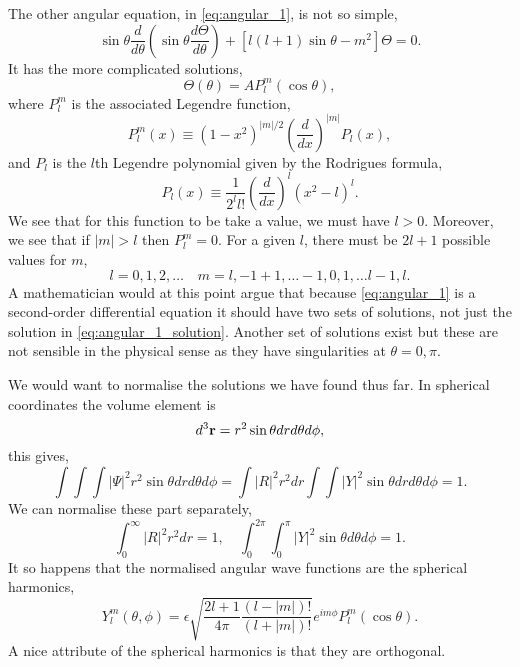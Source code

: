 The other angular equation, in \autoref{eq:angular_1}, is not so simple,
\begin{equation}
    \sin\theta\frac{d}{d\theta}\left(\sin\theta\frac{d\Theta}{d\theta} \right)
    + \left[l(l + 1)\sin\theta - m^2 \right]\Theta = 0.
\end{equation}
It has the more complicated solutions,
\begin{equation}
    \label{eq:angular_1_solution}
    \Theta(\theta) = A P^m_l(\cos\theta),
\end{equation}
where $P^m_l$ is the associated Legendre function,
\begin{equation}
    P^m_l(x) \equiv (1-x^2)^{|m|/2} \left(\frac{d}{dx}\right)^{|m|}P_l(x),
\end{equation}
and $P_l$ is the $l$th Legendre polynomial given by the Rodrigues formula,
\begin{equation}
    P_l(x) \equiv \frac{1}{2^l l!}\left(\frac{d}{dx} \right)^l(x^2 - l)^l.
\end{equation}
We see that for this function to be take a value, we must have $l > 0$. Moreover, 
we see that if $|m| > l$ then $P^m_l = 0$. For a given $l$, there must be 
$2l + 1$ possible values for $m$,
\begin{equation*}
    l = 0, 1, 2, \dots \quad m = l, -1 + 1, \dots - 1, 0, 1, \dots l-1, l.
\end{equation*}
A mathematician would at this point argue that because \autoref{eq:angular_1} is 
a second-order differential equation it should have two sets of solutions, not 
just the solution in \autoref{eq:angular_1_solution}. Another set of solutions 
exist but these are not sensible in the physical sense as they have singularities 
at $\theta=0, \pi$.

We would want to normalise the solutions we have found thus far. In spherical 
coordinates the volume element is 
\begin{equation}
    d^3\vb{r} = r^2 \sin\theta dr d\theta d\phi,
\end{equation}
this gives,
\begin{equation}
    \int\int\int |\Psi|^2 r^2\sin\theta dr d\theta d\phi
    = \int |R|^2r^2 dr \int\int|Y|^2\sin\theta dr d\theta d\phi = 1.
\end{equation}
We can normalise these part separately,
\begin{equation}
    \int_0^\infty |R|^2 r^2 dr = 1, \quad 
    \int_0^{2\pi}\int_0^\pi |Y|^2 \sin\theta d\theta d\phi = 1.
\end{equation}
It so happens that the normalised angular wave functions are the 
spherical harmonics,
\begin{equation}
    Y^m_l(\theta, \phi) 
    =
    \epsilon\sqrt{\frac{2l + 1}{4\pi}\frac{(l - |m|)!}{(l + |m|)!}}
    e^{im\phi} P^m_l(\cos\theta).
\end{equation}
A nice attribute of the spherical harmonics is that they are orthogonal.

